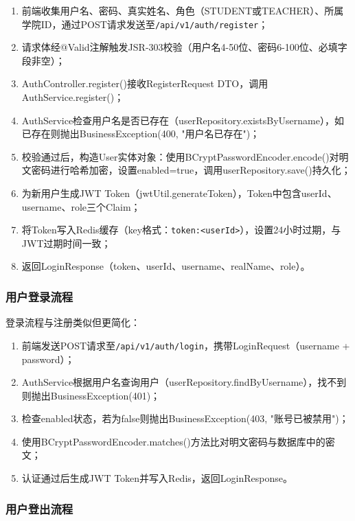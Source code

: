 \documentclass{../softeng}
\begin{document}
\begin{enumerate}
    \item 前端收集用户名、密码、真实姓名、角色（STUDENT或TEACHER）、所属学院ID，通过POST请求发送至\verb|/api/v1/auth/register|；
    \item 请求体经@Valid注解触发JSR-303校验（用户名4-50位、密码6-100位、必填字段非空）；
    \item AuthController.register()接收RegisterRequest DTO，调用AuthService.register()；
    \item AuthService检查用户名是否已存在（userRepository.existsByUsername），如已存在则抛出BusinessException(400, "用户名已存在")；
    \item 校验通过后，构造User实体对象：使用BCryptPasswordEncoder.encode()对明文密码进行哈希加密，设置enabled=true，调用userRepository.save()持久化；
    \item 为新用户生成JWT Token（jwtUtil.generateToken），Token中包含userId、username、role三个Claim；
    \item 将Token写入Redis缓存（key格式：\verb|token:<userId>|），设置24小时过期，与JWT过期时间一致；
    \item 返回LoginResponse（token、userId、username、realName、role）。
\end{enumerate}

\subsubsection{用户登录流程}

登录流程与注册类似但更简化：

\begin{enumerate}
    \item 前端发送POST请求至\verb|/api/v1/auth/login|，携带LoginRequest（username + password）；
    \item AuthService根据用户名查询用户（userRepository.findByUsername），找不到则抛出BusinessException(401)；
    \item 检查enabled状态，若为false则抛出BusinessException(403, "账号已被禁用")；
    \item 使用BCryptPasswordEncoder.matches()方法比对明文密码与数据库中的密文；
    \item 认证通过后生成JWT Token并写入Redis，返回LoginResponse。
\end{enumerate}

\subsubsection{用户登出流程}
\end{document}
